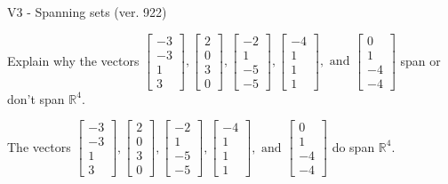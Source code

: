 \begin{exercise}
  \begin{exerciseTitle}V3 - Spanning sets (ver. 922)\end{exerciseTitle}
  \begin{exerciseStatement}
    Explain why the vectors \(\left[\begin{array}{r}
-3 \\
-3 \\
1 \\
3
\end{array}\right] , \left[\begin{array}{r}
2 \\
0 \\
3 \\
0
\end{array}\right] , \left[\begin{array}{r}
-2 \\
1 \\
-5 \\
-5
\end{array}\right] , \left[\begin{array}{r}
-4 \\
1 \\
1 \\
1
\end{array}\right] , \text{ and } \left[\begin{array}{r}
0 \\
1 \\
-4 \\
-4
\end{array}\right]\) span or don't span \(\mathbb{R}^4\). 
	


  \end{exerciseStatement}
  \begin{exerciseAnswer}
   The vectors \(\left[\begin{array}{r}
-3 \\
-3 \\
1 \\
3
\end{array}\right] , \left[\begin{array}{r}
2 \\
0 \\
3 \\
0
\end{array}\right] , \left[\begin{array}{r}
-2 \\
1 \\
-5 \\
-5
\end{array}\right] , \left[\begin{array}{r}
-4 \\
1 \\
1 \\
1
\end{array}\right] , \text{ and } \left[\begin{array}{r}
0 \\
1 \\
-4 \\
-4
\end{array}\right]\) 
  	 do  
	span \(\mathbb{R}^4\).
  



\end{exerciseAnswer}
\end{exercise}
